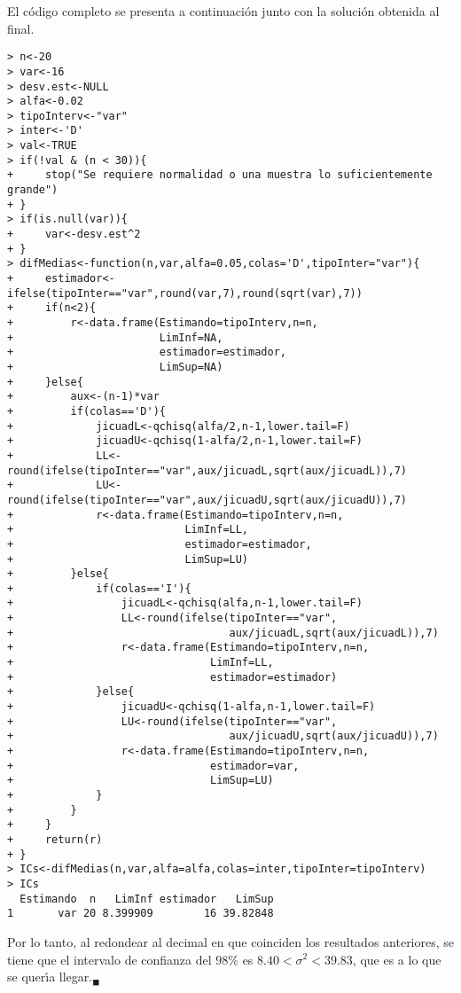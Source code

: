 \begin{solucion}
 \par 
 El c\'odigo completo se presenta a continuaci\'on junto con la soluci\'on obtenida al final.
 \begin{verbatim}
> n<-20
> var<-16
> desv.est<-NULL
> alfa<-0.02
> tipoInterv<-"var"
> inter<-'D'
> val<-TRUE
> if(!val & (n < 30)){
+     stop("Se requiere normalidad o una muestra lo suficientemente grande")
+ }
> if(is.null(var)){
+     var<-desv.est^2
+ }
> difMedias<-function(n,var,alfa=0.05,colas='D',tipoInter="var"){
+     estimador<-ifelse(tipoInter=="var",round(var,7),round(sqrt(var),7))
+     if(n<2){
+         r<-data.frame(Estimando=tipoInterv,n=n,
+                       LimInf=NA,
+                       estimador=estimador,
+                       LimSup=NA)
+     }else{
+         aux<-(n-1)*var
+         if(colas=='D'){
+             jicuadL<-qchisq(alfa/2,n-1,lower.tail=F)
+             jicuadU<-qchisq(1-alfa/2,n-1,lower.tail=F)
+             LL<-round(ifelse(tipoInter=="var",aux/jicuadL,sqrt(aux/jicuadL)),7)
+             LU<-round(ifelse(tipoInter=="var",aux/jicuadU,sqrt(aux/jicuadU)),7)
+             r<-data.frame(Estimando=tipoInterv,n=n,
+                           LimInf=LL,
+                           estimador=estimador,
+                           LimSup=LU)
+         }else{
+             if(colas=='I'){
+                 jicuadL<-qchisq(alfa,n-1,lower.tail=F)
+                 LL<-round(ifelse(tipoInter=="var",
+                                  aux/jicuadL,sqrt(aux/jicuadL)),7)
+                 r<-data.frame(Estimando=tipoInterv,n=n,
+                               LimInf=LL,
+                               estimador=estimador)
+             }else{
+                 jicuadU<-qchisq(1-alfa,n-1,lower.tail=F)
+                 LU<-round(ifelse(tipoInter=="var",
+                                  aux/jicuadU,sqrt(aux/jicuadU)),7)
+                 r<-data.frame(Estimando=tipoInterv,n=n,
+                               estimador=var,
+                               LimSup=LU)
+             }
+         }
+     }
+     return(r)
+ }
> ICs<-difMedias(n,var,alfa=alfa,colas=inter,tipoInter=tipoInterv)
> ICs
  Estimando  n   LimInf estimador   LimSup
1       var 20 8.399909        16 39.82848
 \end{verbatim}
 \vspace{-0.5cm}
 Por lo tanto, al redondear al decimal en que coinciden los resultados anteriores, se tiene que el intervalo de confianza del $98\%$ es $8.40 < \sigma^2 < 39.83$, que es a lo que se quer\'{\i}a llegar.${}_{\blacksquare}$
\end{solucion}
